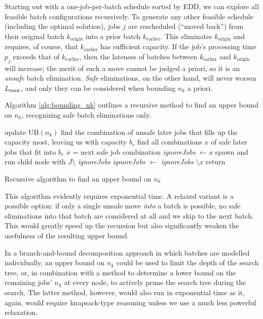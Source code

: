 Starting out with a one-job-per-batch schedule sorted by EDD, we can explore
all feasible batch configurations recursively. To generate any other feasible
schedule (including the optimal solution), jobs $j$ are rescheduled (``moved back'')
from their original batch $k_\text{origin}$ into a prior batch
$k_\text{earlier}$. This eliminates $k_\text{origin}$ and requires, of course,
that $k_\text{earlier}$ has sufficient capacity. If the job's processing time
$p_j$ exceeds that of $k_\text{earlier}$, then the lateness of batches between
$k_\text{earlier}$ and $k_\text{origin}$ will increase; the merit of such a move
cannot be judged a priori, so it is an \textit{unsafe} batch elimination.
\textit{Safe} eliminations, on the other hand, will never worsen $L_{\text{max}}$, and
only they can be considered when bounding $n_k$ a priori.

Algorithm \ref{alg:bounding_nk} outlines a recursive method to find an upper
bound on $n_k$, recognizing safe batch eliminations only.

\begin{algorithm}[h]
\fontsize{9pt}{11.5pt}\selectfont
\begin{algorithmic}
 
  \State update UB$(n_k)$
\EndIf
\State find the combination of unsafe later jobs that fills up the capacity
most, leaving us with capacity $b_r$ 
\State find all combinations $x$ of safe later jobs that fit into $b_r$
\Repeat
  \State $x$ = next safe job combination
  \State \textit{ignoreJobs} $\gets x$ 
  \State spawn and run child node with $J \setminus$ \textit{ignoreJobs}
  \State \textit{ignoreJobs} $\gets$ \textit{ignoreJobs} $\setminus x$
\State return
\end{algorithmic}
\caption{Recursive algorithm to find an upper bound on $n_k$}
\label{alg:bounding_nk}
\end{algorithm}

This algorithm evidently requires exponential time. A relaxed variant is a
possible option: if only a single unsafe move \textit{into} a batch is possible,
no safe eliminations into that batch are considered at all and we skip to the
next batch. This would greatly speed up the recursion but also significantly
weaken the usefulness of the resulting upper bound.

In a branch-and-bound decomposition approach in which batches are modelled
individually, an upper bound on $n_k$ could be used to limit the depth of the
search tree, or, in combination with a method to determine a lower bound on the
remaining jobs' $n_k$ at every node, to actively prune the search tree during
the search. The latter method, however, would also run in exponential time as
it, again, would require knapsack-type reasoning unless we use a much less powerful
relaxation.

